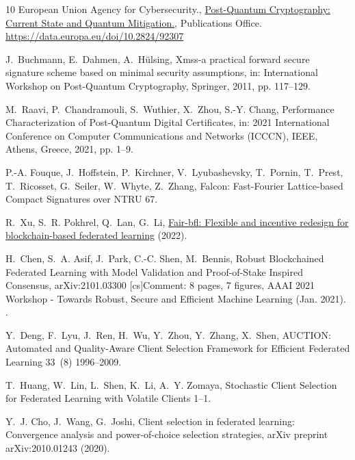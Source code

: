 \documentclass[5p,times]{elsarticle}
\theoremstyle{definition}
\theoremstyle{remark}
\numberwithin{equation}{section}
\begin{document}
\begin{thebibliography}{10}
{European Union Agency for Cybersecurity.},
  \href{https://data.europa.eu/doi/10.2824/92307}{Post-Quantum Cryptography:
  Current State and Quantum Mitigation.}, {Publications Office}.
\newline\urlprefix\url{https://data.europa.eu/doi/10.2824/92307}

J.~Buchmann, E.~Dahmen, A.~H{\"u}lsing, Xmss-a practical forward secure
  signature scheme based on minimal security assumptions, in: International
  Workshop on Post-Quantum Cryptography, Springer, 2011, pp. 117--129.

M.~Raavi, P.~Chandramouli, S.~Wuthier, X.~Zhou, S.-Y. Chang, Performance
  {{Characterization}} of {{Post-Quantum Digital Certificates}}, in: 2021
  {{International Conference}} on {{Computer Communications}} and {{Networks}}
  ({{ICCCN}}), {IEEE}, {Athens, Greece}, 2021, pp. 1--9.


P.-A. Fouque, J.~Hoffstein, P.~Kirchner, V.~Lyubashevsky, T.~Pornin, T.~Prest,
  T.~Ricosset, G.~Seiler, W.~Whyte, Z.~Zhang, Falcon: {{Fast-Fourier
  Lattice-based Compact Signatures}} over {{NTRU}}  67.

R.~Xu, S.~R. Pokhrel, Q.~Lan, G.~Li,
  \href{https://arxiv.org/abs/2206.12899}{Fair-bfl: Flexible and incentive
  redesign for blockchain-based federated learning} (2022).



H.~Chen, S.~A. Asif, J.~Park, C.-C. Shen, M.~Bennis, Robust {{Blockchained
  Federated Learning}} with {{Model Validation}} and {{Proof-of-Stake Inspired
  Consensus}}, arXiv:2101.03300 [cs]Comment: 8 pages, 7 figures, AAAI 2021
  Workshop - Towards Robust, Secure and Efficient Machine Learning (Jan. 2021).
.

Y.~Deng, F.~Lyu, J.~Ren, H.~Wu, Y.~Zhou, Y.~Zhang, X.~Shen, {{AUCTION}}:
  {{Automated}} and {{Quality-Aware Client Selection Framework}} for
  {{Efficient Federated Learning}} 33~(8)  1996--2009.


T.~Huang, W.~Lin, L.~Shen, K.~Li, A.~Y. Zomaya, Stochastic {{Client Selection}}
  for {{Federated Learning}} with {{Volatile Clients}}  1--1.


Y.~J. Cho, J.~Wang, G.~Joshi, Client selection in federated learning:
  Convergence analysis and power-of-choice selection strategies, arXiv preprint
  arXiv:2010.01243 (2020).


\end{thebibliography}
\end{document}
